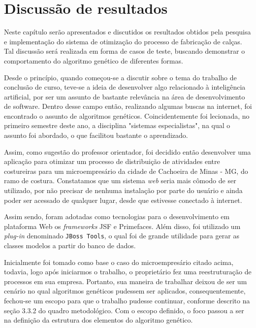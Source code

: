 \chapter{Discussão de resultados}

\par Neste capítulo serão apresentados e discutidos os resultados obtidos pela pesquisa e implementação 
do sistema de otimização do processo de fabricação de calças. Tal discussão será realizada em forma de
casos de teste, buscando demonstrar o comportamento do algoritmo genético de diferentes formas.

\par Desde o princípio, quando começou-se a discutir sobre o tema do 
trabalho de conclusão de curso, teve-se a ideia de desenvolver algo relacionado
à inteligência artificial, por ser um assunto de bastante relevância na área de desenvolvimento de software. 
Dentro desse campo então, realizando algumas buscas na internet, foi encontrado
o assunto de algoritmos genéticos.
Coincidentemente foi lecionada, no primeiro semestre deste ano, a disciplina
"sistemas especialistas", na qual o assunto foi abordado, o que facilitou bastante o aprendizado.

\par Assim, como sugestão do professor orientador, foi decidido então
desenvolver uma aplicação para otimizar um processo de distribuição de atividades entre
costureiras para um microempresário da cidade de Cachoeira de Minas - MG, do ramo de costura. Constatamos 
que um sistema \textit{web} seria mais cômodo de ser utilizado, por não precisar de
nenhuma instalação por parte do usuário e ainda poder ser acessado de qualquer lugar, desde que estivesse 
conectado à internet.

\par Assim sendo, foram adotadas como tecnologias para o desenvolvimento em
plataforma Web os \textit{frameworks} JSF e Primefaces. Além disso, foi utilizado
um \textit{plug-in} denominado \texttt{JBoss Tools}, o qual foi de grande utilidade
para gerar as classes modelos a partir do banco de dados.

\par Inicialmente foi tomado como base o caso do microempresário citado acima,
todavia, logo após iniciarmos o trabalho, o proprietário fez uma reestruturação de processos em sua empresa. 
Portanto, sua maneira de trabalhar deixou de ser um cenário no qual algoritmos genéticos
pudessem ser aplicados, consequentemente, fechou-se um escopo para que o trabalho
pudesse continuar, conforme descrito na seção 3.3.2 do quadro metodológico. Com
o escopo definido, o foco passou a ser na definição da estrutura dos elementos do algoritmo genético.


